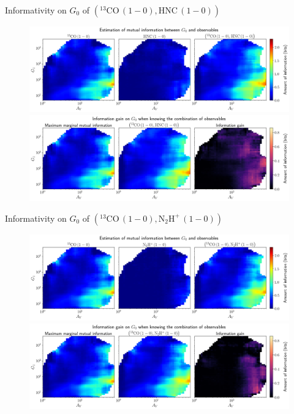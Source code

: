 \documentclass{beamer}
\begin{document}
\begin{frame}{Informativity on $G_0$ of $\left(\mathrm{^{13}CO\,(1-0)},\mathrm{HNC\,(1-0)}\right)$}
    \begin{figure}
        \centering
        \includegraphics[width=0.95\linewidth]{../mi/g0__13co10_hnc10_mi.png}
        \vfill
        \includegraphics[width=0.95\linewidth]{../mi/g0__13co10_hnc10_mi_gain.png}
    \end{figure}
\end{frame}

\begin{frame}{Informativity on $G_0$ of $\left(\mathrm{^{13}CO\,(1-0)},\mathrm{N_2H^+\,(1-0)}\right)$}
    \begin{figure}
        \centering
        \includegraphics[width=0.95\linewidth]{../mi/g0__13co10_n2hp10_mi.png}
        \vfill
        \includegraphics[width=0.95\linewidth]{../mi/g0__13co10_n2hp10_mi_gain.png}
    \end{figure}
\end{frame}
\end{document}
